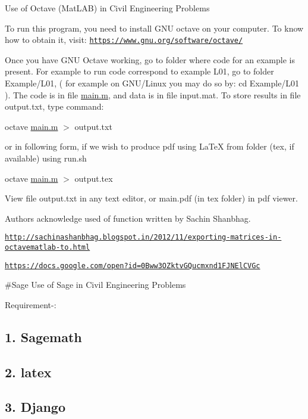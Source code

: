 Use of Octave (Mat\+L\+A\+B) in Civil Engineering Problems

To run this program, you need to install {\ttfamily G\+N\+U octave} on your computer. To know how to obtain it, visit\+: \href{https://www.gnu.org/software/octave/}{\tt https\+://www.\+gnu.\+org/software/octave/}

Once you have G\+N\+U Octave working, go to folder where code for an example is present. For example to run code correspond to example L01, go to folder Example/\+L01, ( for example on G\+N\+U/\+Linux you may do so by\+: {\ttfamily cd Example/\+L01} ). The code is in file {\ttfamily \hyperlink{namespacemain_af6e3698b7f50fc004eb759d7c447fdb3}{main.\+m}}, and data is in file {\ttfamily input.\+mat}. To store results in file {\ttfamily output.\+txt}, type command\+:

{\ttfamily octave \hyperlink{namespacemain_af6e3698b7f50fc004eb759d7c447fdb3}{main.\+m} $>$ output.\+txt}

or in following form, if we wish to produce pdf using La\+Te\+X from folder (tex, if available) using run.\+sh

{\ttfamily octave \hyperlink{namespacemain_af6e3698b7f50fc004eb759d7c447fdb3}{main.\+m} $>$ output.\+tex}

View file output.\+txt in any text editor, or main.\+pdf (in tex folder) in pdf viewer.

Authors acknowledge used of function written by Sachin Shanbhag.

\href{http://sachinashanbhag.blogspot.in/2012/11/exporting-matrices-in-octavematlab-to.html}{\tt http\+://sachinashanbhag.\+blogspot.\+in/2012/11/exporting-\/matrices-\/in-\/octavematlab-\/to.\+html}

\href{https://docs.google.com/open?id=0Bww3OZktvGQucmxnd1FJNElCVGc}{\tt https\+://docs.\+google.\+com/open?id=0\+Bww3\+O\+Zktv\+G\+Qucmxnd1\+F\+J\+N\+El\+C\+V\+Gc}

\#\+Sage Use of Sage in Civil Engineering Problems

Requirement-\/\+:

\subsection*{1. Sagemath}

\subsection*{2. latex}

\subsection*{3. Django}